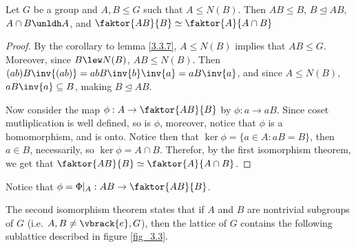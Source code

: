 \begin{theorem}\label{3.4.4}
    Let $G$ be a group and  $A,B \leq G$ such that  $A \leq N(B)$. Then $AB \leq
    B$,  $B \unlhd AB$,  $A \cap B \unldh A$, and  $\faktor{AB}{B} \simeq
    \faktor{A}{A \cap B}$
\end{theorem}
\begin{proof}
    By the corollary to lemma \ref{3.3.7}, $A \leq N(B)$ implies that $AB \leq
    G$. Moreover, since  $B \lew N(B)$, $AB \leq N(B)$. Then
    $(ab)B\inv{(ab)}=abB\inv{b}\inv{a}=aB\inv{a}$, and since $A \leq N(B)$,
    $aB\inv{a} \subseteq B$, making $B \unlhd AB$.

    Now consider the map $\phi:A \rightarrow \faktor{AB}{B}$ by $\phi:a
    \rightarrow aB$. Since coset mutliplication is well defined, so is $\phi$,
    moreover, notice that  $\phi$ is a homomorphism, and is onto. Notice then
    that  $\ker{\phi}=\{a \in A : aB=B\}$, then $a \in B$, necessarily, so
    $\ker{\phi}=A \cap B$. Therefor, by the first isomorphism theorem, we get
    that $\faktor{AB}{B} \simeq \faktor{A}{A \cap B}$.
\end{proof}
\begin{remark}
    Notice that $\phi=\Phi|_{A}:AB \rightarrow \faktor{AB}{B}$.
\end{remark}
\begin{remark}
    The second isomorphism theorem states that if $A$ and $B$ are nontrivial
    subgroups of $G$  (i.e. $A,B \neq \vbrack{e}, G$), then the lattice of $G$
    contains the following sublattice described in figure \ref{fig_3.3}.
\end{remark}

